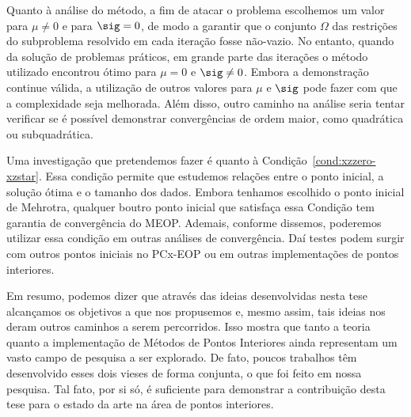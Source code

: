 Quanto à análise do método, a fim de atacar o problema escolhemos um valor para $\mu\neq 0$ e para $\sig = 0$, de modo a garantir que o conjunto $\Omega$ das restrições do subproblema resolvido em cada iteração fosse não-vazio.  No entanto, quando da solução de problemas práticos, em grande parte das iterações o método utilizado encontrou ótimo para $\mu=0$ e $\sig\neq 0$. Embora a demonstração continue válida, a utilização de outros valores para $\mu$ e $\sig$ pode fazer com que a complexidade seja melhorada. Além disso, outro caminho na análise seria tentar verificar se é possível demonstrar convergências de ordem maior, como quadrática ou subquadrática. 

Uma investigação  que pretendemos fazer é quanto à Condição~\ref{cond:xzzero-xzstar}. Essa condição permite que estudemos relações entre o ponto inicial, a solução ótima e o tamanho dos dados. Embora tenhamos escolhido o ponto inicial de Mehrotra, qualquer   boutro ponto inicial que satisfaça essa Condição tem garantia de convergência do MEOP. Ademais, conforme dissemos, poderemos utilizar essa condição em outras análises de convergência. Daí testes podem surgir com outros pontos iniciais no PCx-EOP ou em outras implementações de pontos interiores.



Em resumo, podemos dizer que através das ideias desenvolvidas nesta tese alcançamos os objetivos a que nos propusemos e, mesmo assim, tais ideias  nos deram outros caminhos a serem percorridos. Isso mostra que tanto  a teoria quanto a implementação de Métodos de Pontos Interiores ainda representam um vasto campo de pesquisa a ser explorado. De fato, poucos trabalhos têm desenvolvido esses dois vieses de forma conjunta, o que foi feito  em nossa pesquisa. Tal fato, por si só, é suficiente para demonstrar a contribuição desta tese para o estado da arte na área de pontos interiores. 